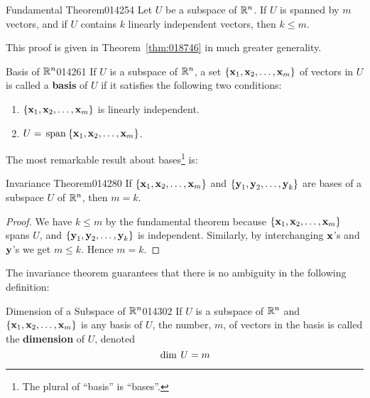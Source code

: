 \begin{theorem}{Fundamental Theorem}{014254} %
Let $U$ be a subspace of $\mathbb{R}^n$. If $U$ is spanned by $m$ vectors, and if $U$ contains $k$ linearly independent vectors, then $k \leq m$.
\end{theorem}

\noindent This proof is given in Theorem~\ref{thm:018746} in much greater generality.

\begin{definition}{Basis of $\mathbb{R}^n$}{014261} %
If $U$ is a subspace of $\mathbb{R}^n$, a set $\{\textbf{x}_{1}, \textbf{x}_{2}, \dots, \textbf{x}_{m}\}$ of vectors in $U$ is called a \textbf{basis} of $U$ if it satisfies the following two conditions:

\begin{enumerate}
\item $\{\textbf{x}_{1}, \textbf{x}_{2}, \dots, \textbf{x}_{m}\}$ is linearly independent.

\item $U = \thinspace\operatorname{span\medspace}\{\textbf{x}_{1}, \textbf{x}_{2}, \dots, \textbf{x}_{m}\}$.

\end{enumerate}
\end{definition}

\noindent The most remarkable result about bases\footnote{The plural of ``basis'' is ``bases''.}
 is:

\begin{theorem}{Invariance Theorem}{014280}
If $\{\textbf{x}_{1}, \textbf{x}_{2}, \dots, \textbf{x}_{m}\}$ and $\{\textbf{y}_{1}, \textbf{y}_{2}, \dots, \textbf{y}_{k}\}$ are bases of a subspace $U$ of $\mathbb{R}^n$, then $m = k$.
\end{theorem}

\begin{proof}
We have $k \leq m$ by the fundamental theorem because $\{\textbf{x}_{1}, \textbf{x}_{2}, \dots, \textbf{x}_{m}\}$ spans $U$, and $\{\textbf{y}_{1}, \textbf{y}_{2}, \dots, \textbf{y}_{k}\}$ is independent. Similarly, by interchanging $\textbf{x}$'s and $\textbf{y}$'s we get $m \leq k$. Hence $m = k$.
\end{proof}

The invariance theorem guarantees that there is no ambiguity in the following definition:

\begin{definition}{Dimension of a Subspace of $\mathbb{R}^n$}{014302} %
If $U$ is a subspace of $\mathbb{R}^n$ and $\{\textbf{x}_{1}, \textbf{x}_{2}, \dots, \textbf{x}_{m}\}$ is any basis
of $U$, the number, $m$, of vectors in the basis is called the
\textbf{dimension} of $U$, denoted
\begin{equation*}
\thinspace\operatorname{dim \medspace} U = m
\end{equation*}
\end{definition}

